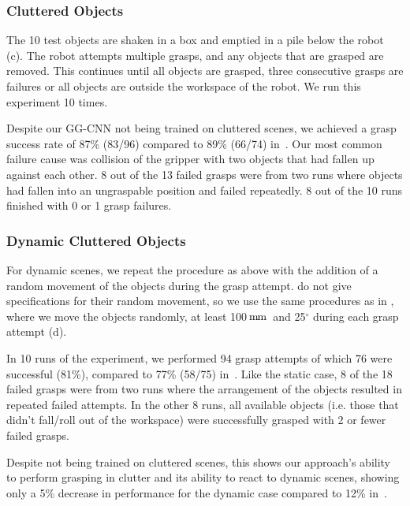 \documentclass[conference]{IEEEtran}
\newcommand{\pack}	{\hspace{-0.08em}}
\newcommand{\mm}	{\ensuremath{\rm\,m\pack m}}
\begin{document}
\subsubsection{Cluttered Objects}

The 10 test objects are shaken in a box and emptied in a pile below the robot (c).  The robot attempts multiple grasps, and any objects that are grasped are removed.  This continues until all objects are grasped, three consecutive grasps are failures or all objects are outside the workspace of the robot.  We run this experiment 10 times.

Despite our GG-CNN not being trained on cluttered scenes, we achieved a grasp success rate of 87\% (83/96) compared to 89\% (66/74) in~\cite{Viereck2017LearningImages}.  Our most common failure cause was collision of the gripper with two objects that had fallen up against each other.  8 out of the 13 failed grasps were from two runs where objects had fallen into an ungraspable position and failed repeatedly.  8 out of the 10 runs finished with 0 or 1 grasp failures.

\subsubsection{Dynamic Cluttered Objects}

For dynamic scenes, we repeat the procedure as above with the addition of a random movement of the objects during the grasp attempt.  \citet{Viereck2017LearningImages} do not give specifications for their random movement, so we use the same procedures as in , where we move the objects randomly, at least 100\mm~and 25$^\circ$ during each grasp attempt (d).

In 10 runs of the experiment, we performed 94 grasp attempts of which 76 were successful (81\%), compared to 77\% (58/75) in~\cite{Viereck2017LearningImages}.  Like the static case, 8 of the 18 failed grasps were from two runs where the arrangement of the objects resulted in repeated failed attempts.  In the other 8 runs, all available objects (i.e. those that didn't fall/roll out of the workspace) were successfully grasped with 2 or fewer failed grasps.  

Despite not being trained on cluttered scenes, this shows our approach's ability to perform grasping in clutter and its ability to react to dynamic scenes, showing only a 5\% decrease in performance for the dynamic case compared to 12\% in~\cite{Viereck2017LearningImages}.
\end{document}
